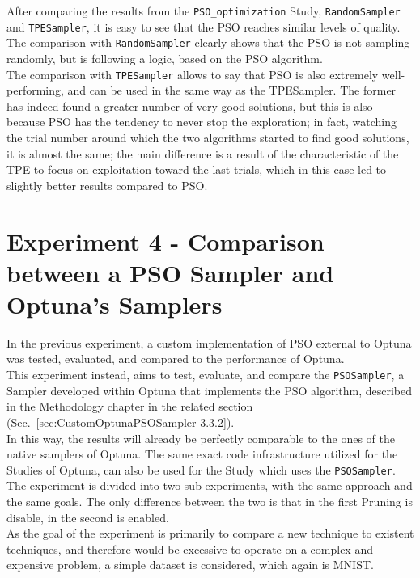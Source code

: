 After comparing the results from the \texttt{PSO\_optimization} Study, \texttt{RandomSampler} and \texttt{TPESampler}, it is easy to see that the PSO reaches similar levels of quality.
\\[0.3cm]The comparison with \texttt{RandomSampler} clearly shows that the PSO is not sampling randomly, but is following a logic, based on the PSO algorithm.
\\[0.3cm]The comparison with \texttt{TPESampler} allows to say that PSO is also extremely well-performing, and can be used in the same way as the TPESampler. The former has indeed found a greater number of very good solutions, but this is also because PSO has the tendency to never stop the exploration; in fact, watching the trial number around which the two algorithms started to find good solutions, it is almost the same; the main difference is a result of the characteristic of the TPE to focus on exploitation toward the last trials, which in this case led to slightly better results compared to PSO.

\section[Experiment 4 - PSOSampler vs Optuna's Samplers]{Experiment 4 - Comparison between a PSO Sampler and Optuna's Samplers}

In the previous experiment, a custom implementation of PSO external to Optuna was tested, evaluated, and compared to the performance of Optuna.
\\[0.3cm]This experiment instead, aims to test, evaluate, and compare the \texttt{PSOSampler}, a Sampler developed within Optuna that implements the PSO algorithm, described in the Methodology chapter in the related section (Sec.~\ref{sec:CustomOptunaPSOSampler-3.3.2}).
\\[0.3cm]In this way, the results will already be perfectly comparable to the ones of the native samplers of Optuna. The same exact code infrastructure utilized for the Studies of Optuna, can also be used for the Study which uses the \texttt{PSOSampler}.
\\[0.3cm]The experiment is divided into two sub-experiments, with the same approach and the same goals. The only difference between the two is that in the first Pruning is disable, in the second is enabled.
\\[0.3cm]As the goal of the experiment is primarily to compare a new technique to existent techniques, and therefore would be excessive to operate on a complex and expensive problem, a simple dataset is considered, which again is MNIST.

